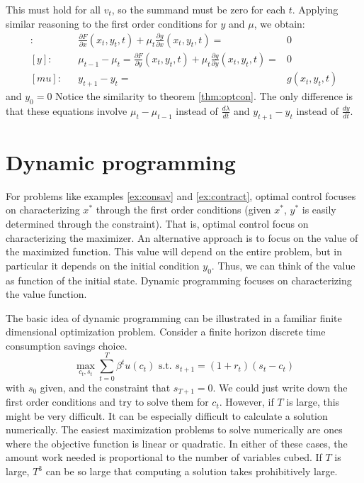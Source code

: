 \documentclass[12pt,reqno]{amsart}
\theoremstyle{definition}
\begin{document}
This must hold for all $v_t$, so the summand must be zero for each
$t$. Applying similar reasoning to the first order conditions for $y$
and $\mu$, we obtain:
\begin{align*}
  [x]:&& \frac{\partial F}{\partial x}(x_t,y_t,t)  + \mu_t \frac{\partial
    g}{\partial x}(x_t,y_t,t) = &  0 \\
  [y]: && \mu_{t-1}-\mu_t = \frac{\partial F}{\partial
    y}(x_t,y_t,t)  + \mu_t \frac{\partial 
    g}{\partial y}(x_t,y_t,t) = &  0 \\
  [mu]:&& y_{t+1} - y_t = & g(x_t,y_t,t) 
\end{align*}
and $y_0 = 0$
Notice the similarity to theorem \ref{thm:optcon}. The only difference 
is that these equations involve $\mu_{t} - \mu_{t-1}$ instead of
$\frac{d\lambda}{dt}$ and $y_{t+1}-y_t$ instead of $\frac{dy}{dt}$. 

\section{Dynamic programming}

For problems like examples \ref{ex:consav} and \ref{ex:contract},
optimal control focuses on characterizing $x^*$ through the first
order conditions (given $x^*$, $y^*$ is easily determined through the
constraint). That is, optimal control focus on characterizing the maximizer. An
alternative approach is to focus on the value of the maximized
function. This value will depend on the entire problem, but in
particular it depends on the initial condition $y_0$. Thus, we can
think of the value as function of the initial state. Dynamic
programming focuses on characterizing the value function.  

The basic idea of dynamic programming can be illustrated in a familiar
finite dimensional optimization problem. Consider a finite horizon
discrete time consumption savings choice. 
\[ \max_{c_t,s_t} \sum_{t=0}^T \beta^t u(c_t) \text{ s.t. } s_{t+1} =
(1+r_t) (s_t - c_t) \] with $s_0$ given, and the constraint that
$s_{T+1} = 0$. We could just write down the first order conditions and
try to solve them for $c_t$. However, if $T$ is large, this might be
very difficult. It can be especially difficult to calculate a solution
numerically. The easiest maximization problems to solve numerically
are ones where the objective function is linear or quadratic. In
either of these cases, the amount work needed is proportional to the
number of variables cubed. If $T$ is large, $T^3$ can be so large that
computing a solution takes prohibitively large. 
\end{document}
